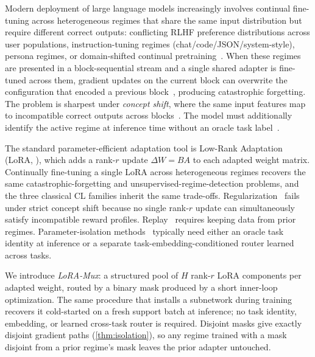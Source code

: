 \documentclass{article}
\theoremstyle{plain}
\theoremstyle{remark}
\begin{document}
Modern deployment of large language models increasingly involves continual fine-tuning across heterogeneous regimes that share the same input distribution but require different correct outputs: conflicting RLHF preference distributions across user populations, instruction-tuning regimes (chat/code/JSON/system-style), persona regimes, or domain-shifted continual pretraining~\citep{gururangan2020dontstop,yildiz2024investigating}. When these regimes are presented in a block-sequential stream and a single shared adapter is fine-tuned across them, gradient updates on the current block can overwrite the configuration that encoded a previous block~\citep{mccloskey1989catastrophic,french1999catastrophic}, producing catastrophic forgetting. The problem is sharpest under \emph{concept shift}, where the same input features map to incompatible correct outputs across blocks~\citep{gama2014concept}. The model must additionally identify the active regime at inference time without an oracle task label~\citep{aljundi2019taskfree}.

The standard parameter-efficient adaptation tool is Low-Rank Adaptation (LoRA, \citealt{hu2022lora}), which adds a rank-$r$ update $\Delta W = BA$ to each adapted weight matrix.  Continually fine-tuning a single LoRA across heterogeneous regimes recovers the same catastrophic-forgetting and unsupervised-regime-detection problems, and the three classical CL families inherit the same trade-offs. Regularization~\citep{kirkpatrick2017overcoming,zenke2017continual} fails under strict concept shift because no single rank-$r$ update can simultaneously satisfy incompatible reward profiles. Replay~\citep{rebuffi2017icarl,lopez2017gradient} requires keeping data from prior regimes. Parameter-isolation methods~\citep{mallya2018packnet,serra2018overcoming,wortsman2020supermasks,rusu2016progressive,yoon2018lifelong} typically need either an oracle task identity at inference or a separate task-embedding-conditioned router learned across tasks.

We introduce \emph{LoRA-Mux}: a structured pool of $H$ rank-$r$ LoRA components per adapted weight, routed by a binary mask produced by a short inner-loop optimization. The same procedure that installs a subnetwork during training recovers it cold-started on a fresh support batch at inference; no task identity, embedding, or learned cross-task router is required. Disjoint masks give exactly disjoint gradient paths (\cref{thm:isolation}), so any regime trained with a mask disjoint from a prior regime's mask leaves the prior adapter untouched.
\end{document}

